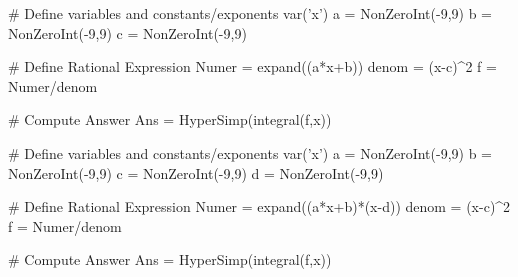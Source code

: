 

\begin{sagesilent}
# Define variables and constants/exponents
var('x')
a = NonZeroInt(-9,9)
b = NonZeroInt(-9,9)
c = NonZeroInt(-9,9)

# Define Rational Expression
Numer = expand((a*x+b))
denom = (x-c)^2
f = Numer/denom

# Compute Answer
Ans = HyperSimp(integral(f,x))
\end{sagesilent}



\begin{sagesilent}
# Define variables and constants/exponents
var('x')
a = NonZeroInt(-9,9)
b = NonZeroInt(-9,9)
c = NonZeroInt(-9,9)
d = NonZeroInt(-9,9)

# Define Rational Expression
Numer = expand((a*x+b)*(x-d))
denom = (x-c)^2
f = Numer/denom

# Compute Answer
Ans = HyperSimp(integral(f,x))
\end{sagesilent}




